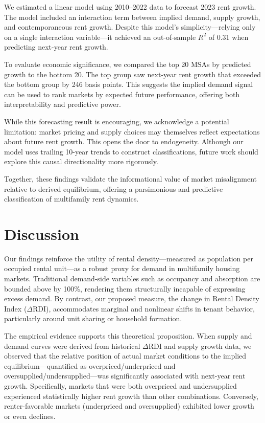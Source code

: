 \documentclass[sn-mathphys-num]{sn-jnl}%
\begin{document}
We estimated a linear model using 2010--2022 data to forecast 2023 rent growth. The model included an interaction term between implied demand, supply growth, and contemporaneous rent growth. Despite this model’s simplicity—relying only on a single interaction variable—it achieved an out-of-sample $R^2$ of 0.31 when predicting next-year rent growth.

To evaluate economic significance, we compared the top 20 MSAs by predicted growth to the bottom 20. The top group saw next-year rent growth that exceeded the bottom group by 246 basis points. This suggests the implied demand signal can be used to rank markets by expected future performance, offering both interpretability and predictive power.

While this forecasting result is encouraging, we acknowledge a potential limitation: market pricing and supply choices may themselves reflect expectations about future rent growth. This opens the door to endogeneity. Although our model uses trailing 10-year trends to construct classifications, future work should explore this causal directionality more rigorously.

Together, these findings validate the informational value of market misalignment relative to derived equilibrium, offering a parsimonious and predictive classification of multifamily rent dynamics.

\section*{Discussion}

Our findings reinforce the utility of rental density---measured as population per occupied rental unit---as a robust proxy for demand in multifamily housing markets. Traditional demand-side variables such as occupancy and absorption are bounded above by 100\%, rendering them structurally incapable of expressing excess demand. By contrast, our proposed measure, the change in Rental Density Index (\(\Delta\text{RDI}\)), accommodates marginal and nonlinear shifts in tenant behavior, particularly around unit sharing or household formation.

The empirical evidence supports this theoretical proposition. When supply and demand curves were derived from historical \(\Delta\text{RDI}\) and supply growth data, we observed that the relative position of actual market conditions to the implied equilibrium---quantified as overpriced/underpriced and oversupplied/undersupplied---was significantly associated with next-year rent growth. Specifically, markets that were both overpriced and undersupplied experienced statistically higher rent growth than other combinations. Conversely, renter-favorable markets (underpriced and oversupplied) exhibited lower growth or even declines. 
\end{document}
